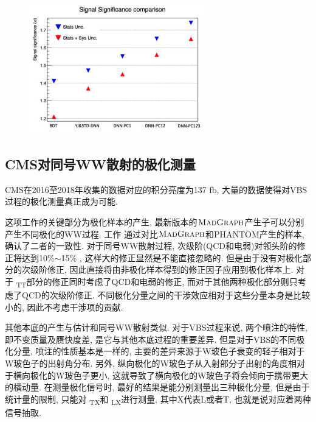 \documentclass{SCIS2020cn}
\newcommand{\MADGRAPH}{\textsc{MadGraph}\xspace}
\newcommand{\Wboson}{\text{W}}
\begin{document}
\begin{figure}[ht!]
\centering
\includegraphics[width=3in,height=2.25in]{Figure-19.pdf}
\label{fig:19}
\end{figure}

\subsection{CMS对同号WW散射的极化测量}

CMS在2016至2018年收集的数据对应的积分亮度为137 fb, 大量的数据使得对VBS过程的极化测量真正成为可能. 

这项工作的关键部分为极化样本的产生, 最新版本的$\MADGRAPH$产生子可以分别产生不同极化的WW过程. 工作 \cite{58} 通过对比$\MADGRAPH$和PHANTOM产生的样本, 确认了二者的一致性. 对于同号WW散射过程, 次级阶(QCD和电弱)对领头阶的修正将达到10\%$\sim$15\% , 这样大的修正显然是不能直接忽略的. 但是由于没有对极化部分的次级阶修正, 因此直接将由非极化样本得到的修正因子应用到极化样本上. 对于 \Wboson\textsubscript{T}\Wboson\textsubscript{T}部分的修正同时考虑了QCD和电弱的修正, 而对于其他两种极化部分则只考虑了QCD的次级阶修正. 不同极化分量之间的干涉效应相对于这些分量本身是比较小的, 因此不考虑干涉项的贡献. 

其他本底的产生与估计和同号WW散射类似. 对于VBS过程来说, 两个喷注的特性, 即不变质量及赝快度差, 是它与其他本底过程的重要差异. 但是对于VBS的不同极化分量, 喷注的性质基本是一样的, 主要的差异来源于W玻色子衰变的轻子相对于W玻色子的出射角分布. 另外, 纵向极化的W玻色子从入射部分子出射的角度相对于横向极化的W玻色子更小, 这就导致了横向极化的W玻色子将会倾向于携带更大的横动量. 在测量极化信号时, 最好的结果是能分别测量出三种极化分量, 但是由于统计量的限制, 只能对 \Wboson\textsubscript{T}\Wboson\textsubscript{X}和 \Wboson\textsubscript{L}\Wboson\textsubscript{X}进行测量, 其中X代表L或者T, 也就是说对应着两种信号抽取. 
\end{document}
